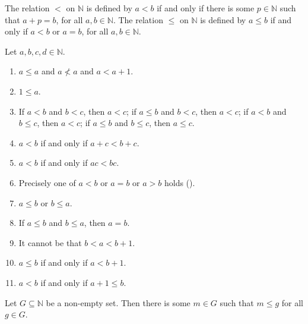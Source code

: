 \begin{definition} %
	\label{nat:d:relation}
	The relation $<$ on $\mathbb{N}$ is defined by $a < b$ if and only if there is some $p \in \mathbb{N}$ such that $a + p = b$, for all $a, b \in \mathbb{N}$. The relation $\leq$ on $\mathbb{N}$ is defined by $a \leq b$ if and only if $a < b$ or $a = b$, for all $a,b \in \mathbb{N}$.
\end{definition}

\begin{theorem} %
	\label{nat:t:relprops}
	Let $a, b, c, d \in \mathbb{N}$.
	\begin{enumerate}
		\item \label{nat:t:relprops:1}
		      $a \leq a$ and $a \nless a$ and $a < a + 1$.
		\item \label{nat:t:relprops:2}
		      $1 \leq a$.
		\item \label{nat:t:relprops:3}
		      If $a < b$ and $b < c$, then $a < c$; if $a \leq b$ and $b < c$, then $a < c$; if $a < b$ and $b \leq c$, then $a < c$; if $a \leq b$ and $b \leq c$, then $a \leq c$.
		\item \label{nat:t:relprops:4}
		      $a < b$ if and only if $a + c < b + c$.
		\item \label{nat:t:relprops:5}
		      $a < b$ if and only if $a c < b c$.
		\item {}
		      Precisely one of $a < b$ or $a = b$ or $a > b$ holds \quad ().
		\item \label{nat:t:relprops:7}
		      $a \leq b$ or $b \leq a$.
		\item \label{nat:t:relprops:8}
		      If $a \leq b$ and $b \leq a$, then $a = b$.
		\item \label{nat:t:relprops:9}
		      It cannot be that $b < a < b + 1$.
		\item \label{nat:t:relprops:10}
		      $a \leq b$ if and only if $a < b + 1$.
		\item \label{nat:t:relprops:11}
		      $a < b$ if and only if $a + 1 \leq b$.
	\end{enumerate}
\end{theorem}

\begin{theorem} %
	\label{nat:t:wop}
	Let $G \subseteq \mathbb{N}$ be a non-empty set. Then there is some $m \in G$ such that $m \leq g$ for all $g \in G$.
\end{theorem}


